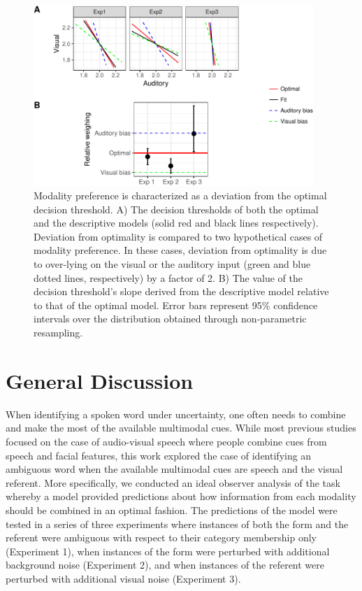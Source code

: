 \documentclass[english,man]{apa6}
\theoremstyle{definition}
\theoremstyle{definition}
\theoremstyle{definition}
\theoremstyle{remark}
\begin{document}
\begin{figure}

{\centering \includegraphics[width=400px]{ms_files/figure-latex/bias-1} 

}

\caption{Modality preference is characterized as a deviation from the optimal decision threshold. A) The decision thresholds of both the optimal and the descriptive models (solid red and black lines respectively). Deviation from optimality is compared to two hypothetical cases of modality preference. In these cases, deviation from  optimality is due to over-lying on the visual or the auditory input (green and blue dotted lines, respectively) by a factor of 2. B) The value of the decision threshold's slope derived from the descriptive model relative to that of the optimal model. Error bars represent 95\% confidence intervals over the distribution obtained through non-parametric resampling.}\label{fig:bias}
\end{figure}

\section{General Discussion}\label{general-discussion}

When identifying a spoken word under uncertainty, one often needs to
combine and make the most of the available multimodal cues. While most
previous studies focused on the case of audio-visual speech where people
combine cues from speech and facial features, this work explored the
case of identifying an ambiguous word when the available multimodal cues
are speech and the visual referent. More specifically, we conducted an
ideal observer analysis of the task whereby a model provided predictions
about how information from each modality should be combined in an
optimal fashion. The predictions of the model were tested in a series of
three experiments where instances of both the form and the referent were
ambiguous with respect to their category membership only (Experiment 1),
when instances of the form were perturbed with additional background
noise (Experiment 2), and when instances of the referent were perturbed
with additional visual noise (Experiment 3).
\end{document}
